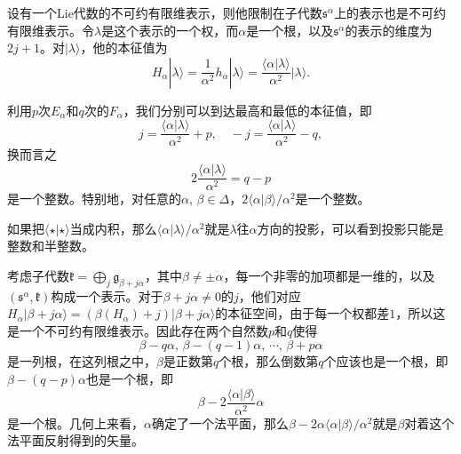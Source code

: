 \documentclass[9pt]{extarticle}
\newcommand{\lag}{{\mathfrak{g}}}
\DeclareMathOperator{\ad}{ad}
\begin{document}


\para 设有一个Lie代数的不可约有限维表示，则他限制在子代数$\mathfrak{s}^\alpha$上的表示也是不可约有限维表示。令$\lambda$是这个表示的一个权，而$\alpha$是一个根，以及$\mathfrak{s}^\alpha$的表示的维度为$2j+1$。对$|\lambda\rangle$，他的本征值为
\[
	H_\alpha|\lambda\rangle = \frac{1}{\alpha^2}h_\alpha|\lambda\rangle=\frac{\langle\alpha|\lambda\rangle}{\alpha^2}|\lambda\rangle.
\]

利用$p$次$E_\alpha$和$q$次的$F_\alpha$，我们分别可以到达最高和最低的本征值，即
\[
	j =\frac{\langle\alpha|\lambda\rangle}{\alpha^2}+p,\quad -j=\frac{\langle\alpha|\lambda\rangle}{\alpha^2}-q,
\]
换而言之
\[
	2\frac{\langle\alpha|\lambda\rangle}{\alpha^2}=q-p
\]
是一个整数。特别地，对任意的$\alpha$, $\beta\in \Delta$，$2\langle \alpha|\beta \rangle/\alpha^2$是一个整数。

如果把$\langle \star|\star \rangle$当成内积，那么$\langle \alpha|\lambda \rangle/\alpha^2$就是$\lambda$往$\alpha$方向的投影，可以看到投影只能是整数和半整数。

\para 考虑子代数$\mathfrak{k}=\bigoplus_j\lag_{\beta+j\alpha}$，其中$\beta\neq \pm \alpha$，每一个非零的加项都是一维的，以及$(\mathfrak{s}^\alpha,\mathfrak{k})$构成一个表示。对于$\beta+j\alpha\neq 0$的$j$，他们对应$H_\alpha|\beta+j\alpha\rangle =(\beta(H_\alpha)+j)|\beta+j\alpha\rangle$的本征空间，由于每一个权都差$1$，所以这是一个不可约有限维表示。因此存在两个自然数$p$和$q$使得
\[
	\beta-q\alpha,\,\beta-(q-1)\alpha,\,\cdots,\,\beta+p\alpha
\]
是一列根，在这列根之中，$\beta$是正数第$q$个根，那么倒数第$q$个应该也是一个根，即$\beta-(q-p)\alpha$也是一个根，即
\[
	\beta-2\frac{\langle \alpha|\beta \rangle}{\alpha^2}\alpha
\]
是一个根。几何上来看，$\alpha$确定了一个法平面，那么$\beta-2\alpha\langle \alpha|\beta \rangle/\alpha^2$就是$\beta$对着这个法平面反射得到的矢量。
\end{document}
